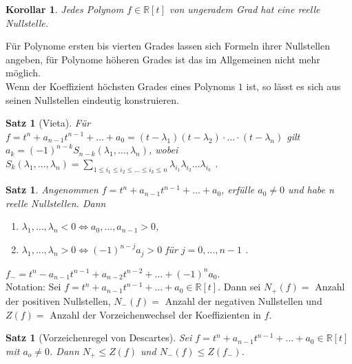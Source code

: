 \documentclass[12pt,a4paper]{article}
\theoremstyle{plain}
\newtheorem{Satz}[Theorem]{Satz}
\newtheorem{Korollar}[Theorem]{Korollar}
\newcommand{\R}{\mathbb{R}}
\numberwithin{equation}{section}
\begin{document}
\begin{Korollar}
Jedes Polynom $f\in\R[t]$ von ungeradem Grad hat eine reelle Nullstelle.
\end{Korollar}
Für Polynome ersten bis vierten Grades lassen sich Formeln ihrer Nullstellen angeben, für Polynome höheren Grades ist das im Allgemeinen nicht mehr möglich.\\
Wenn der Koeffizient höchsten Grades eines Polynoms $1$ ist, so lässt es sich aus seinen Nullstellen eindeutig konstruieren.
\begin{Satz}[Vieta]
Für $f=t^n+a_{n-1}t^{n-1}+\ldots+a_0=(t-\lambda_1)(t-\lambda_2)\cdot\ldots\cdot(t-\lambda_n)$ gilt $a_k=(-1)^{n-k}S_{n-k}(\lambda_1,\ldots,\lambda_n)$, wobei $S_k(\lambda_1,\ldots,\lambda_n)=\sum_{1\leq i_1\leq i_2\leq\ldots\leq i_k\leq n}{\lambda_{i_1}\lambda_{i_2}\ldots\lambda_{i_k}}$ .
\end{Satz}
\begin{Satz}
Angenommen $f=t^n+a_{n-1}t^{n-1}+\ldots+a_0$, erfülle $a_0\neq 0$ und habe n reelle Nullstellen. Dann
\begin{enumerate}
\renewcommand{\labelenumi}{\emph{(\alph{enumi})}}
\item $\lambda_1,\ldots,\lambda_n<0 \Leftrightarrow a_0,\ldots,a_{n-1}>0$,
\item $\lambda_1,\ldots,\lambda_n>0 \Leftrightarrow (-1)^{n-j}a_j>0$ für $j=0,\ldots,n-1$ .
\end{enumerate}
\end{Satz}
$f_{-}=t^n-a_{n-1}t^{n-1}+a_{n-2}t^{n-2}+\ldots+(-1)^n a_0$.\\
Notation: Sei $f=t^n+a_{n-1}t^{n-1}+\ldots+a_0\in\R[t]$. Dann sei $N_{+}(f) = $ Anzahl der positiven Nullstellen, $N_{-}(f) = $ Anzahl der negativen Nullstellen und $Z(f) = $ Anzahl der Vorzeichenwechsel der Koeffizienten in $f$.
\begin{Satz}[Vorzeichenregel von Descartes]
Sei $f=t^n+a_{n-1}t^{n-1}+\ldots+a_0\in\R[t]$ mit $a_o\neq 0$. Dann $N_{+}\leq Z(f)$ und $N_{-}(f)\leq Z(f_{-})$.
\end{Satz}
\end{document}
